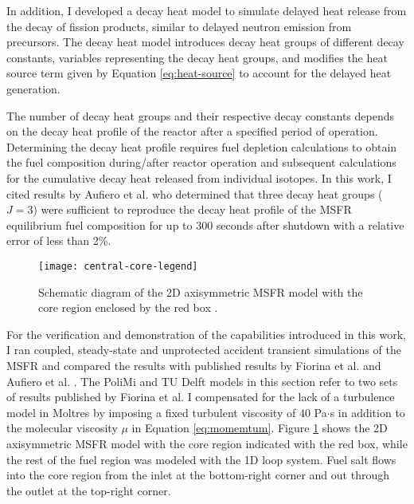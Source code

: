 In addition, I developed a decay heat model to simulate delayed heat release
from the decay of fission products, similar to delayed neutron emission
from precursors. The decay heat model introduces decay heat groups of different
decay constants, variables representing the decay heat groups, and modifies the
heat source term given by Equation \ref{eq:heat-source} to account for
the delayed heat generation. 

The number of decay heat groups and their respective decay constants depends on
the decay heat profile of the reactor after a specified period of operation.
Determining the decay heat profile requires fuel depletion calculations to
obtain the fuel composition during/after reactor operation and subsequent
calculations for the cumulative decay heat released from individual isotopes.
In this work, I cited results by Aufiero et al. \cite{aufiero_extended_2013}
who determined that three decay heat groups ($J=3$) were sufficient to
reproduce the decay heat profile of the \gls{MSFR} equilibrium fuel composition
for up to 300 seconds after shutdown with a relative error of less than 2\%.

\begin{figure}[htb!]
	\centering
	\texttt{[image: central-core-legend]}
	\caption{Schematic diagram of the 2D axisymmetric \gls{MSFR} model with
	the core region enclosed by the red box \cite{park_advancement_2020}.}
	\label{fig:msfr-geometry}
\end{figure}

For the verification and demonstration of the capabilities introduced in this
work, I ran coupled, steady-state and unprotected accident transient
simulations of the \gls{MSFR} and compared the results with published results
by Fiorina et al. \cite{fiorina_modelling_2014} and Aufiero et al.
\cite{aufiero_development_2014}. The PoliMi and TU Delft models in this section
refer to two sets of results published by Fiorina et al. I compensated for
the lack of a turbulence model in Moltres by imposing a fixed turbulent
viscosity of 40 Pa$\cdot$s in addition to the molecular viscosity $\mu$ in
Equation \ref{eq:momemtum}. Figure \ref{fig:msfr-geometry} shows the 2D
axisymmetric \gls{MSFR} model with the core region indicated with the red box,
while the rest of the fuel region was modeled with the 1D loop system. Fuel
salt flows into the core region from the inlet at the bottom-right corner and
out through the outlet at the top-right corner.

